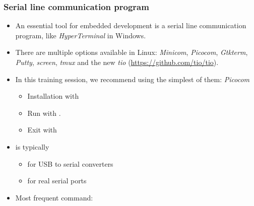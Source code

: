 \begin{frame}
  \frametitle{Serial line communication program}
  \begin{itemize}
  \item An essential tool for embedded development is a serial line
    communication program, like {\em HyperTerminal} in Windows.
  \item There are multiple options available in Linux: {\em Minicom},
    {\em Picocom}, {\em Gtkterm}, {\em Putty}, {\em screen}, {\em tmux}
    and the new {\em tio} (\url{https://github.com/tio/tio}).
  \item In this training session, we recommend using the simplest of
    them: {\em Picocom}
    \begin{itemize}
    \item Installation with 
    \item Run with .
    \item Exit with \code{[Ctrl][a] [Ctrl][x]}
    \end{itemize}
  \item {} is typically
    \begin{itemize}
    \item {} for USB to serial converters
    \item {} for real serial ports
    \end{itemize}
  \item Most frequent command: 
  \end{itemize}
\end{frame}
